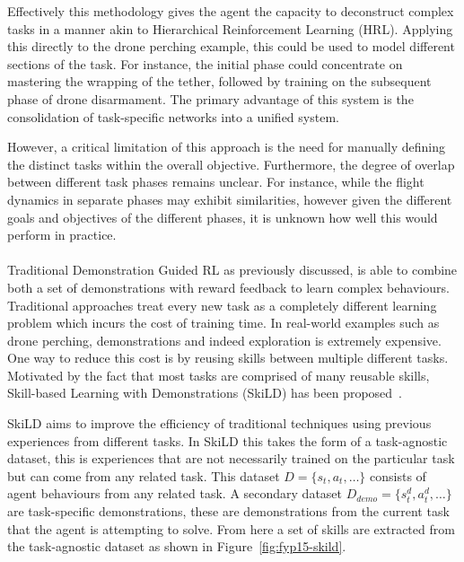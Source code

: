 Effectively this methodology gives the agent the capacity to deconstruct complex tasks in a manner akin to Hierarchical Reinforcement Learning (HRL). 
Applying this directly to the drone perching example, this could be used to model different sections of the task.
For instance, the initial phase could concentrate on mastering the wrapping of the tether, followed by training on the subsequent phase of drone disarmament. 
The primary advantage of this system is the consolidation of task-specific networks into a unified system.

However, a critical limitation of this approach is the need for manually defining the distinct tasks within the overall objective. 
Furthermore, the degree of overlap between different task phases remains unclear. 
For instance, while the flight dynamics in separate phases may exhibit similarities, however given the different goals and objectives of the different phases, it is unknown how well this would perform in practice. \\\\


Traditional Demonstration Guided RL as previously discussed, is able to combine both a set of demonstrations with reward feedback to learn complex behaviours.
Traditional approaches treat every new task as a completely different learning problem which incurs the cost of training time.
In real-world examples such as drone perching, demonstrations and indeed exploration is extremely expensive.
One way to reduce this cost is by reusing skills between multiple different tasks.
Motivated by the fact that most tasks are comprised of many reusable skills, Skill-based Learning with Demonstrations (SkiLD) has been proposed~\cite{fyp15-demo-guided-rl-with-skills}.

SkiLD aims to improve the efficiency of traditional techniques using previous experiences from different tasks.
In SkiLD this takes the form of a task-agnostic dataset, this is experiences that are not necessarily trained on the particular task but can come from any related task.
This dataset $D = \{s_t, a_t, \dots\}$ consists of agent behaviours from any related task.
A secondary dataset $D_{demo} = \{s_{t}^{d}, a_{t}^{d}, \dots\}$ are task-specific demonstrations, these are demonstrations from the current task that the agent is attempting to solve.
From here a set of skills are extracted from the task-agnostic dataset as shown in Figure~\ref{fig:fyp15-skild}.

